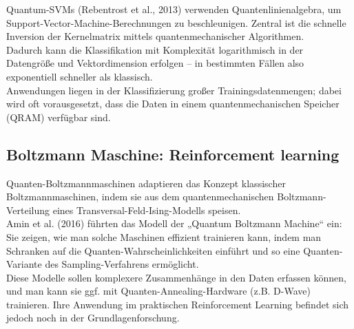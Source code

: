 Quantum-SVMs (Rebentrost et al., 2013) verwenden Quantenlinienalgebra, um Support-Vector-Machine-Berechnungen zu beschleunigen. Zentral ist die schnelle Inversion der Kernelmatrix mittels quantenmechanischer Algorithmen.\\
Dadurch kann die Klassifikation mit Komplexität logarithmisch in der Datengröße und Vektordimension erfolgen – in bestimmten Fällen also exponentiell schneller als klassisch.\\
Anwendungen liegen in der Klassifizierung großer Trainingsdatenmengen; dabei wird oft vorausgesetzt, dass die Daten in einem quantenmechanischen Speicher (QRAM) verfügbar sind.

\subsection{Boltzmann Maschine: Reinforcement learning}

Quanten-Boltzmannmaschinen adaptieren das Konzept klassischer Boltzmannmaschinen, indem sie aus dem quantenmechanischen Boltzmann-Verteilung eines Transversal-Feld-Ising-Modells speisen.\\
Amin et al. (2016) führten das Modell der „Quantum Boltzmann Machine“ ein: Sie zeigen, wie man solche Maschinen effizient trainieren kann, indem man Schranken auf die Quanten-Wahrscheinlichkeiten einführt und so eine Quanten-Variante des Sampling-Verfahrens ermöglicht.\\
Diese Modelle sollen komplexere Zusammenhänge in den Daten erfassen können, und man kann sie ggf. mit Quanten-Annealing-Hardware (z.B. D-Wave) trainieren. Ihre Anwendung im praktischen Reinforcement Learning befindet sich jedoch noch in der Grundlagenforschung.

\printbibliography
